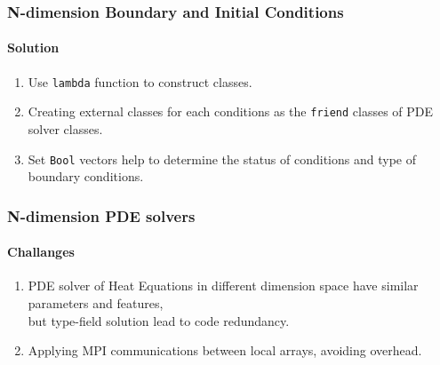 \begin{frame}
  \frametitle{N-dimension Boundary and Initial Conditions}
  \framesubtitle{Solution}
  \begin{enumerate}
    \item Use \texttt{lambda} function to construct classes.
    \item Creating external classes for each conditions as the \texttt{friend} classes of PDE solver classes.
    \item Set \texttt{Bool} vectors help to determine the status of conditions and type of boundary conditions.
  \end{enumerate}
\end{frame}


\begin{frame}
  \frametitle{N-dimension PDE solvers}
  \framesubtitle{Challanges}
  \begin{enumerate}
    \item PDE solver of Heat Equations in different dimension space have similar parameters and features, \\but type-field solution lead to code redundancy.
    \item Applying MPI communications between local arrays, avoiding overhead.
  \end{enumerate}
\end{frame}



